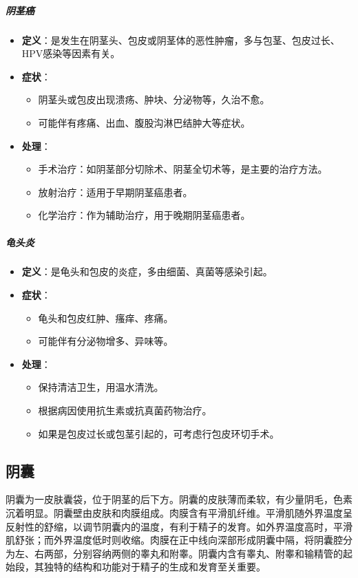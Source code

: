 \subparagraph{阴茎癌}
\begin{itemize}
\item \textbf{定义}：是发生在阴茎头、包皮或阴茎体的恶性肿瘤，多与包茎、包皮过长、HPV感染等因素有关。
\item \textbf{症状}：
  \begin{itemize}
  \item 阴茎头或包皮出现溃疡、肿块、分泌物等，久治不愈。
  \item 可能伴有疼痛、出血、腹股沟淋巴结肿大等症状。
  \end{itemize}
\item \textbf{处理}：
  \begin{itemize}
  \item 手术治疗：如阴茎部分切除术、阴茎全切术等，是主要的治疗方法。
  \item 放射治疗：适用于早期阴茎癌患者。
  \item 化学治疗：作为辅助治疗，用于晚期阴茎癌患者。
  \end{itemize}
\end{itemize}

\subparagraph{龟头炎}
\begin{itemize}
\item \textbf{定义}：是龟头和包皮的炎症，多由细菌、真菌等感染引起。
\item \textbf{症状}：
  \begin{itemize}
  \item 龟头和包皮红肿、瘙痒、疼痛。
  \item 可能伴有分泌物增多、异味等。
  \end{itemize}
\item \textbf{处理}：
  \begin{itemize}
  \item 保持清洁卫生，用温水清洗。
  \item 根据病因使用抗生素或抗真菌药物治疗。
  \item 如果是包皮过长或包茎引起的，可考虑行包皮环切手术。
  \end{itemize}
\end{itemize}

\subsection{阴囊}

阴囊为一皮肤囊袋，位于阴茎的后下方。阴囊的皮肤薄而柔软，有少量阴毛，色素沉着明显。阴囊壁由皮肤和肉膜组成。肉膜含有平滑肌纤维。平滑肌随外界温度呈反射性的舒缩，以调节阴囊内的温度，有利于精子的发育。如外界温度高时，平滑肌舒张；而外界温度低时则收缩。肉膜在正中线向深部形成阴囊中隔，将阴囊腔分为左、右两部，分别容纳两侧的睾丸和附睾。阴囊内含有睾丸、附睾和输精管的起始段，其独特的结构和功能对于精子的生成和发育至关重要。

